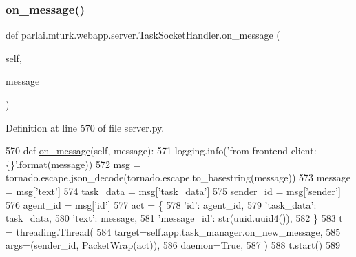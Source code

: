 \subsubsection{\texorpdfstring{on\+\_\+message()}{on\_message()}}
{\footnotesize\ttfamily def parlai.\+mturk.\+webapp.\+server.\+Task\+Socket\+Handler.\+on\+\_\+message (\begin{DoxyParamCaption}\item[{}]{self,  }\item[{}]{message }\end{DoxyParamCaption})}



Definition at line 570 of file server.\+py.


\begin{DoxyCode}
570     \textcolor{keyword}{def }\hyperlink{namespaceparlai_1_1chat__service_1_1services_1_1browser__chat_1_1client_a01c1536b48e2f5badd2fe58ea02b9a5c}{on\_message}(self, message):
571         logging.info(\textcolor{stringliteral}{'from frontend client: \{\}'}.\hyperlink{namespaceparlai_1_1chat__service_1_1services_1_1messenger_1_1shared__utils_a32e2e2022b824fbaf80c747160b52a76}{format}(message))
572         msg = tornado.escape.json\_decode(tornado.escape.to\_basestring(message))
573         message = msg[\textcolor{stringliteral}{'text'}]
574         task\_data = msg[\textcolor{stringliteral}{'task\_data'}]
575         sender\_id = msg[\textcolor{stringliteral}{'sender'}]
576         agent\_id = msg[\textcolor{stringliteral}{'id'}]
577         act = \{
578             \textcolor{stringliteral}{'id'}: agent\_id,
579             \textcolor{stringliteral}{'task\_data'}: task\_data,
580             \textcolor{stringliteral}{'text'}: message,
581             \textcolor{stringliteral}{'message\_id'}: \hyperlink{namespacegenerate__task__READMEs_a5b88452ffb87b78c8c85ececebafc09f}{str}(uuid.uuid4()),
582         \}
583         t = threading.Thread(
584             target=self.app.task\_manager.on\_new\_message,
585             args=(sender\_id, PacketWrap(act)),
586             daemon=\textcolor{keyword}{True},
587         )
588         t.start()
589 
\end{DoxyCode}
\mbox{\label{classparlai_1_1mturk_1_1webapp_1_1server_1_1TaskSocketHandler_adb3510933e76ec5d4f7ac2d1dd52962f}} 

